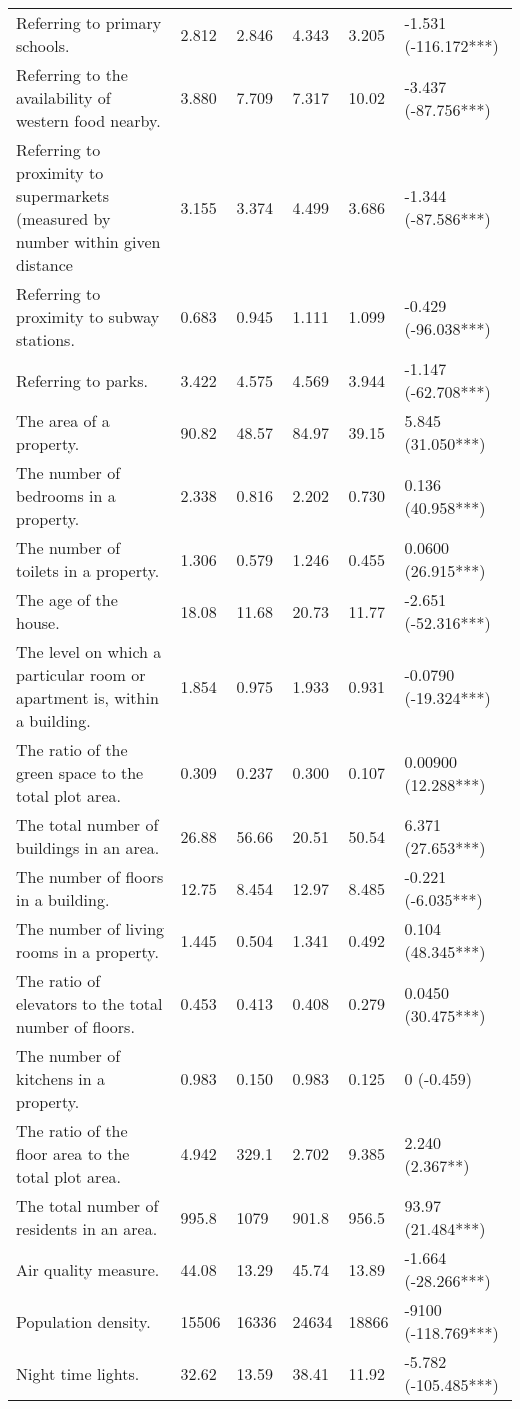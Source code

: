 \begin{tabular}{p{5cm}lllll}
Referring to primary schools. & 2.812 & 2.846 & 4.343 & 3.205 & -1.531 (-116.172***) \\
Referring to the availability of western food nearby. & 3.880 & 7.709 & 7.317 & 10.02 & -3.437 (-87.756***) \\
Referring to proximity to supermarkets (measured by number within given distance & 3.155 & 3.374 & 4.499 & 3.686 & -1.344 (-87.586***) \\
Referring to proximity to subway stations. & 0.683 & 0.945 & 1.111 & 1.099 & -0.429 (-96.038***) \\
Referring to parks. & 3.422 & 4.575 & 4.569 & 3.944 & -1.147 (-62.708***) \\
The area of a property. & 90.82 & 48.57 & 84.97 & 39.15 & 5.845 (31.050***) \\
The number of bedrooms in a property. & 2.338 & 0.816 & 2.202 & 0.730 & 0.136 (40.958***) \\
The number of toilets in a property. & 1.306 & 0.579 & 1.246 & 0.455 & 0.0600 (26.915***) \\
The age of the house. & 18.08 & 11.68 & 20.73 & 11.77 & -2.651 (-52.316***) \\
The level on which a particular room or apartment is, within a building. & 1.854 & 0.975 & 1.933 & 0.931 & -0.0790 (-19.324***) \\
The ratio of the green space to the total plot area. & 0.309 & 0.237 & 0.300 & 0.107 & 0.00900 (12.288***) \\
The total number of buildings in an area. & 26.88 & 56.66 & 20.51 & 50.54 & 6.371 (27.653***) \\
The number of floors in a building. & 12.75 & 8.454 & 12.97 & 8.485 & -0.221 (-6.035***) \\
The number of living rooms in a property. & 1.445 & 0.504 & 1.341 & 0.492 & 0.104 (48.345***) \\
The ratio of elevators to the total number of floors. & 0.453 & 0.413 & 0.408 & 0.279 & 0.0450 (30.475***) \\
The number of kitchens in a property. & 0.983 & 0.150 & 0.983 & 0.125 & 0 (-0.459) \\
The ratio of the floor area to the total plot area. & 4.942 & 329.1 & 2.702 & 9.385 & 2.240 (2.367**) \\
The total number of residents in an area. & 995.8 & 1079 & 901.8 & 956.5 & 93.97 (21.484***) \\
Air quality measure. & 44.08 & 13.29 & 45.74 & 13.89 & -1.664 (-28.266***) \\
Population density. & 15506 & 16336 & 24634 & 18866 & -9100 (-118.769***) \\
Night time lights. & 32.62 & 13.59 & 38.41 & 11.92 & -5.782 (-105.485***) \\
\bottomrule
\end{tabular}

